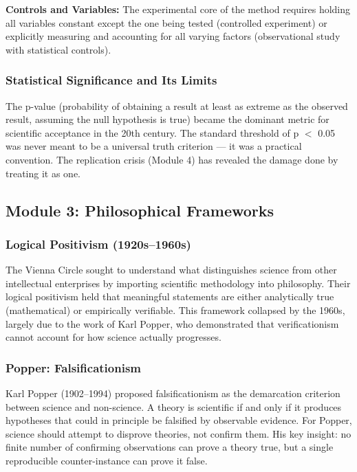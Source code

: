 \documentclass[11pt,letterpaper]{article}
\begin{document}
\textbf{Controls and Variables:} The experimental core of the method requires holding all variables constant except the one being tested (controlled experiment) or explicitly measuring and accounting for all varying factors (observational study with statistical controls).

\subsubsection{Statistical Significance and Its Limits}

The p-value (probability of obtaining a result at least as extreme as the observed result, assuming the null hypothesis is true) became the dominant metric for scientific acceptance in the 20th century. The standard threshold of p $<$ 0.05 was never meant to be a universal truth criterion --- it was a practical convention. The replication crisis (Module 4) has revealed the damage done by treating it as one.

\subsection{Module 3: Philosophical Frameworks}

\subsubsection{Logical Positivism (1920s--1960s)}

The Vienna Circle sought to understand what distinguishes science from other intellectual enterprises by importing scientific methodology into philosophy. Their logical positivism held that meaningful statements are either analytically true (mathematical) or empirically verifiable. This framework collapsed by the 1960s, largely due to the work of Karl Popper, who demonstrated that verificationism cannot account for how science actually progresses.

\subsubsection{Popper: Falsificationism}

Karl Popper (1902--1994) proposed falsificationism as the demarcation criterion between science and non-science. A theory is scientific if and only if it produces hypotheses that could in principle be falsified by observable evidence. For Popper, science should attempt to disprove theories, not confirm them. His key insight: no finite number of confirming observations can prove a theory true, but a single reproducible counter-instance can prove it false.
\end{document}
